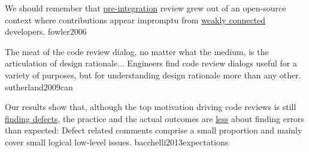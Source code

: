 \documentclass{article}
\begin{document}

  {We should remember that \ul{pre-integration} review grew out of an open-source context where contributions appear impromptu from \ul{weakly connected} developers.}
  {fowler2006}


  {The meat of the code review dialog, no matter what the medium, is the articulation of design rationale... Engineers find code review dialogs useful for a variety of purposes, but for understanding design rationale more than any other.}
  {sutherland2009can}

  {Our results show that, although the top motivation driving code reviews is still \ul{finding defects}, the practice and the actual outcomes are \ul{less} about finding errors than expected: Defect related comments comprise a small proportion and mainly cover small logical low-level issues.}
  {bacchelli2013expectations}
\end{document}
